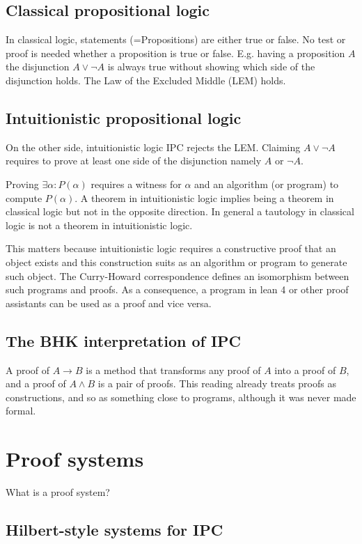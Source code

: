 \subsection{Classical propositional logic}
In classical logic, statements (=Propositions) are either true or false. No test or proof is needed whether a proposition is true or false. E.g. having a proposition $A$ the disjunction $A \lor \neg A$ is always true without showing which side of the disjunction holds. The Law of the Excluded Middle (LEM) holds.

\subsection{Intuitionistic propositional logic}
On the other side, intuitionistic logic IPC
rejects the LEM. Claiming $A \lor \neg A$ requires to prove at least one side of the disjunction namely $A$ or $\neg A$.

Proving $\exists \alpha : P(\alpha)$ requires a witness for $\alpha$ and an algorithm (or program) to compute $P(\alpha)$. A theorem in intuitionistic logic implies being a theorem in classical logic but not in the opposite direction. In general a tautology in classical logic is not a theorem in intuitionistic logic.

This matters because intuitionistic logic requires a constructive proof that an object exists and this construction suits as an algorithm or program to generate such object. The  Curry-Howard correspondence defines an isomorphism between such programs and proofs. As a consequence, a program in lean 4 or other proof assistants can be used as a proof and vice versa. \cite{web:intuitionistic_logic}

\subsection{The BHK interpretation of IPC}
\label{s:bhk_interpretation}
A proof of $A \to B$ is a method that transforms any proof of $A$ into a proof of $B$, and a proof of $A \wedge B$ is a pair of proofs. This reading already treats proofs as constructions, and so as something close to programs, although it was never made formal.

\section{Proof systems}

What is a proof system?
\subsection{Hilbert-style systems for IPC}



